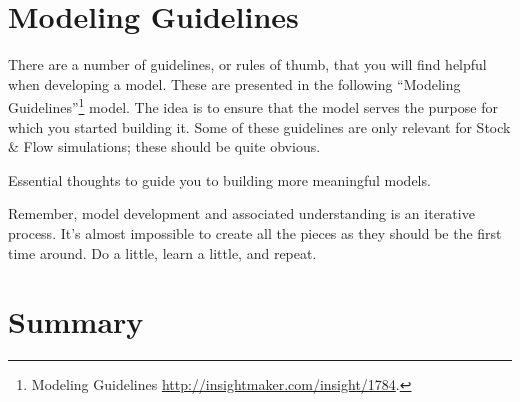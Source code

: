 \documentclass[]{memoir}
\begin{document}
\section{Modeling Guidelines}

There are a number of guidelines, or rules of thumb, that you will find
helpful when developing a model. These are presented in the following
``Modeling Guidelines''\footnote{Modeling Guidelines
  \url{http://insightmaker.com/insight/1784}.} model. The idea is to
ensure that the model serves the purpose for which you started building
it. Some of these guidelines are only relevant for Stock \& Flow
simulations; these should be quite obvious.

\FloatBarrier 

\begin{model}[frametitle={Model: Modeling Guidelines}] 

 Essential thoughts to guide you to building more meaningful models.




 \end{model}

Remember, model development and associated understanding is an iterative
process. It's almost impossible to create all the pieces as they should
be the first time around. Do a little, learn a little, and repeat.

\section{Summary}
\end{document}
